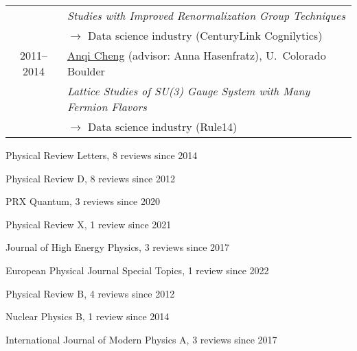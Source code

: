 \documentclass[10 pt]{article}
\renewcommand{\section}[2]%
    {\pagebreak[2]\vspace{1.3\baselineskip}%
     \hspace{0in}%
     \marginpar{
     \raggedright \scshape #1}#2}
\newenvironment{tightlist}
  {\begin{list} {} {\setlength{\topsep}{-8 pt} \setlength{\itemsep}{-3 pt} \setlength{\leftmargin}{0 mm}}}{\end{list}}
\newcommand{\lra}{\ensuremath{\longrightarrow} }
\begin{document}
\begin{tabular}[t]{cl}
                & \textit{Studies with Improved Renormalization Group Techniques}                                                                   \\
                & \qquad \lra Data science industry (CenturyLink Cognilytics)                                                                       \\[6 pt]
  2011--2014    & \href{https://inspirehep.net/literature/1858863}{Anqi Cheng} (advisor: Anna Hasenfratz), U.~Colorado Boulder                      \\
                & \textit{Lattice Studies of SU(3) Gauge System with Many Fermion Flavors}                                                          \\
                & \qquad \lra Data science industry (Rule14)                                                                                        \\
\end{tabular}

\newpage



\section{Journal referee} %

\vspace{-12 pt} %
\begin{tightlist} %
  \item Physical Review Letters, 8 reviews since 2014
  \item Physical Review D, 8 reviews since 2012
  \item PRX Quantum, 3 reviews since 2020
  \item Physical Review X, 1 review since 2021
  \item Journal of High Energy Physics, 3 reviews since 2017
  \item European Physical Journal Special Topics, 1 review since 2022
  \item Physical Review B, 4 reviews since 2012
  \item Nuclear Physics B, 1 review since 2014
  \item International Journal of Modern Physics A, 3 reviews since 2017
\end{tightlist}
\end{document}
